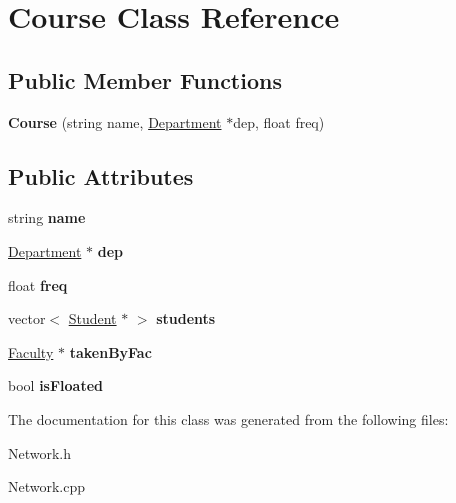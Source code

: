 \hypertarget{classCourse}{\section{\-Course \-Class \-Reference}
\label{classCourse}
}
\subsection*{\-Public \-Member \-Functions}
\begin{DoxyCompactItemize}
\item 
\hypertarget{classCourse_a3bfa559be305ebcc13176f447c612b97}{{\bfseries \-Course} (string name, \hyperlink{classDepartment}{\-Department} $\ast$dep, float freq)}\label{classCourse_a3bfa559be305ebcc13176f447c612b97}

\end{DoxyCompactItemize}
\subsection*{\-Public \-Attributes}
\begin{DoxyCompactItemize}
\item 
\hypertarget{classCourse_acb352d670b8d61c75119ad86c68cb950}{string {\bfseries name}}\label{classCourse_acb352d670b8d61c75119ad86c68cb950}

\item 
\hypertarget{classCourse_a08052b934a90cb71a531342feafd37f0}{\hyperlink{classDepartment}{\-Department} $\ast$ {\bfseries dep}}\label{classCourse_a08052b934a90cb71a531342feafd37f0}

\item 
\hypertarget{classCourse_a73c792b5c16d43729d542cec74b78380}{float {\bfseries freq}}\label{classCourse_a73c792b5c16d43729d542cec74b78380}

\item 
\hypertarget{classCourse_a5bdfa7c6afb08c9e0f4058bec46551fb}{vector$<$ \hyperlink{classStudent}{\-Student} $\ast$ $>$ {\bfseries students}}\label{classCourse_a5bdfa7c6afb08c9e0f4058bec46551fb}

\item 
\hypertarget{classCourse_afc2119467e0fd676de947e0362ada365}{\hyperlink{classFaculty}{\-Faculty} $\ast$ {\bfseries taken\-By\-Fac}}\label{classCourse_afc2119467e0fd676de947e0362ada365}

\item 
\hypertarget{classCourse_a661df794d286ec3096b7d4267f340788}{bool {\bfseries is\-Floated}}\label{classCourse_a661df794d286ec3096b7d4267f340788}

\end{DoxyCompactItemize}


\-The documentation for this class was generated from the following files\-:\begin{DoxyCompactItemize}
\item 
\-Network.\-h\item 
\-Network.\-cpp\end{DoxyCompactItemize}

